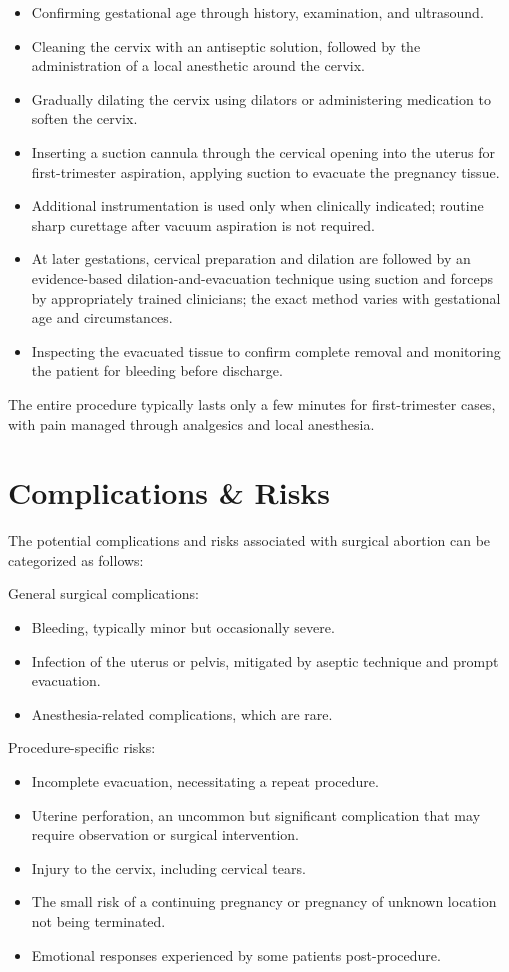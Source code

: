 \begin{itemize}
  \item Confirming gestational age through history, examination, and ultrasound.
  \item Cleaning the cervix with an antiseptic solution, followed by the administration of a local anesthetic around the cervix.
  \item Gradually dilating the cervix using dilators or administering medication to soften the cervix.
  \item Inserting a suction cannula through the cervical opening into the uterus for first-trimester aspiration, applying suction to evacuate the pregnancy tissue.
  \item Additional instrumentation is used only when clinically indicated; routine sharp curettage after vacuum aspiration is not required.
  \item At later gestations, cervical preparation and dilation are followed by an evidence-based dilation-and-evacuation technique using suction and forceps by appropriately trained clinicians; the exact method varies with gestational age and circumstances.
  \item Inspecting the evacuated tissue to confirm complete removal and monitoring the patient for bleeding before discharge.
\end{itemize}

The entire procedure typically lasts only a few minutes for first-trimester cases, with pain managed through analgesics and local anesthesia.

\section*{Complications \& Risks}
The potential complications and risks associated with surgical abortion can be categorized as follows:

General surgical complications:

\begin{itemize}
  \item Bleeding, typically minor but occasionally severe.
  \item Infection of the uterus or pelvis, mitigated by aseptic technique and prompt evacuation.
  \item Anesthesia-related complications, which are rare.
\end{itemize}

Procedure-specific risks:

\begin{itemize}
  \item Incomplete evacuation, necessitating a repeat procedure.
  \item Uterine perforation, an uncommon but significant complication that may require observation or surgical intervention.
  \item Injury to the cervix, including cervical tears.
  \item The small risk of a continuing pregnancy or pregnancy of unknown location not being terminated.
  \item Emotional responses experienced by some patients post-procedure.
\end{itemize}

